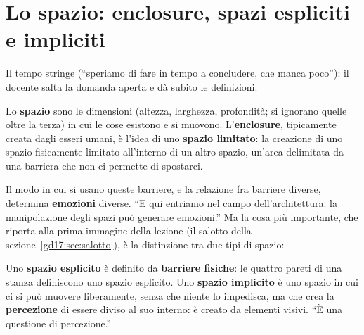 \section{Lo spazio: enclosure, spazi espliciti e impliciti}
\label{gd17:sec:spazio}



Il tempo stringe (``speriamo di fare in tempo a concludere, che manca poco''): il docente
salta la domanda aperta e dà subito le definizioni.

\begin{definition}
Lo \textbf{spazio} sono le dimensioni (altezza, larghezza, profondità; si ignorano quelle
oltre la terza) in cui le cose esistono e si muovono. L'\textbf{enclosure}, tipicamente
creata dagli esseri umani, è l'idea di uno \textbf{spazio limitato}: la creazione di uno
spazio fisicamente limitato all'interno di un altro spazio, un'area delimitata da una
barriera che non ci permette di spostarci.
\end{definition}

Il modo in cui si usano queste barriere, e la relazione fra barriere diverse, determina
\textbf{emozioni} diverse. ``E qui entriamo nel campo dell'architettura: la
manipolazione degli spazi può generare emozioni.'' Ma la cosa più importante, che riporta
alla prima immagine della lezione (il salotto della sezione~\ref{gd17:sec:salotto}), è la
distinzione tra due tipi di spazio:

\begin{definition}
Uno \textbf{spazio esplicito} è definito da \textbf{barriere fisiche}: le quattro pareti
di una stanza definiscono uno spazio esplicito. Uno \textbf{spazio implicito} è uno
spazio in cui ci si può muovere liberamente, senza che niente lo impedisca, ma che crea la
\textbf{percezione} di essere diviso al suo interno: è creato da elementi visivi. ``È una
questione di percezione.''
\end{definition}

